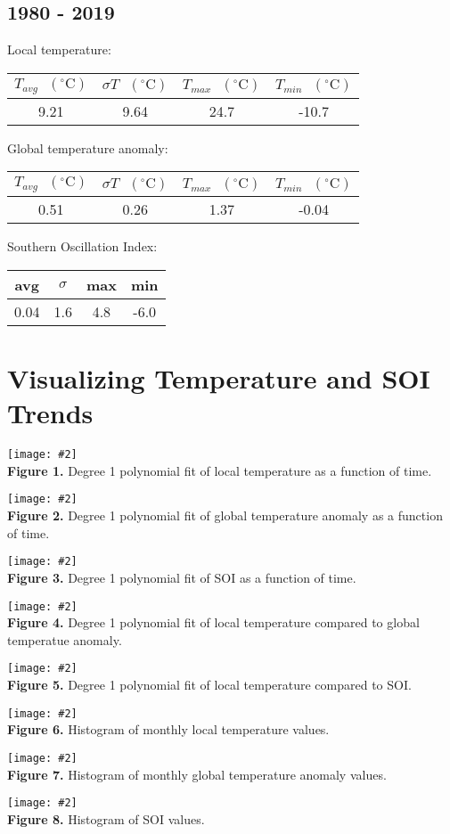 \documentclass[12pt]{article}
\newcommand{\img}[4]{
 \begin{center}
 \texttt{[image: \#2]} \\
 \textbf{Figure #3.} #4
 \end{center}
}
\begin{document}
\subsection*{1980 - 2019}
Local temperature:
\begin{center}
\begin{tabular}{c | c | c | c}
 $T_{avg} \textrm{ } (^{\circ} \textrm{C})$ &
 $\sigma T \textrm{ } (^{\circ} \textrm{C})$ &
 $T_{max} \textrm{ } (^{\circ} \textrm{C})$ &
 $T_{min} \textrm{ } (^{\circ} \textrm{C})$ \\ %
 \hline
 9.21 & 9.64 & 24.7 & -10.7 \\ %
\end{tabular}
\end{center}
Global temperature anomaly:
\begin{center}
\begin{tabular}{c | c | c | c}
 $T_{avg} \textrm{ } (^{\circ} \textrm{C})$ &
 $\sigma T \textrm{ } (^{\circ} \textrm{C})$ &
 $T_{max} \textrm{ } (^{\circ} \textrm{C})$ &
 $T_{min} \textrm{ } (^{\circ} \textrm{C})$ \\ %
 \hline
 0.51 & 0.26 & 1.37 & -0.04 \\ %
\end{tabular}
\end{center}
Southern Oscillation Index:
\begin{center}
\begin{tabular}{c | c | c | c}
 avg & $\sigma$ & max & min \\ %
 \hline
 0.04 & 1.6 & 4.8 & -6.0 \\ %
\end{tabular}
\end{center}

\section*{Visualizing Temperature and SOI Trends}
\img{0.65}{../plots/fits/local.png}{1}{
 Degree 1 polynomial fit of local temperature as a
 function of time.
}
\img{0.65}{../plots/fits/global.png}{2}{
 Degree 1 polynomial fit of global temperature anomaly as a
 function of time.
}
\img{0.65}{../plots/fits/soi.png}{3}{
 Degree 1 polynomial fit of SOI as a
 function of time.
}
\img{0.65}{../plots/compare/local_vs_global.png}{4}{
 Degree 1 polynomial fit of local temperature compared
 to global temperatue anomaly.
}
\img{0.65}{../plots/compare/local_vs_soi.png}{5}{
 Degree 1 polynomial fit of local temperature compared
 to SOI.
}
\img{0.65}{../plots/histogram/local.png}{6}{
 Histogram of monthly local temperature values.
}
\img{0.65}{../plots/histogram/global.png}{7}{
 Histogram of monthly global temperature anomaly values.
}
\img{0.65}{../plots/histogram/soi.png}{8}{
 Histogram of SOI values.
}
\end{document}
